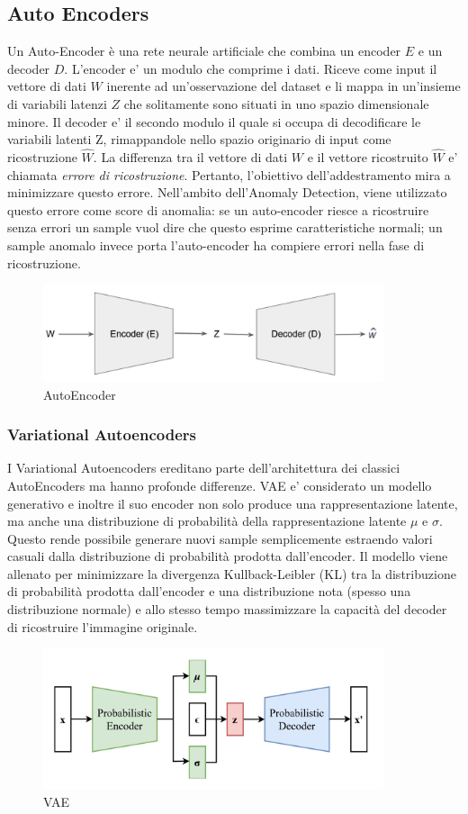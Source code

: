 \subsection{Auto Encoders}
Un Auto-Encoder è una rete neurale artificiale che combina un encoder $E$ e un decoder $D$. L'encoder e' un modulo che comprime i dati. Riceve come input il vettore di dati $W$ inerente ad un'osservazione del dataset e li mappa in un'insieme di variabili latenzi $Z$ che solitamente sono situati in uno spazio dimensionale minore. Il decoder e' il secondo modulo il quale si occupa di decodificare le variabili latenti Z, rimappandole nello spazio originario di input come ricostruzione $\widehat{W}$. La differenza tra il vettore di dati $W$ e il vettore ricostruito $\widehat{W}$ e' chiamata \textit{errore di ricostruzione}. Pertanto, l'obiettivo dell'addestramento mira a minimizzare questo errore. Nell'ambito dell'Anomaly Detection, viene utilizzato questo errore come score di anomalia: se un auto-encoder riesce a ricostruire senza errori un sample vuol dire che questo esprime caratteristiche normali; un sample anomalo invece porta l'auto-encoder ha compiere errori nella fase di ricostruzione.
\begin{figure}[t]
	\centering
	\includegraphics[width=10cm, scale=1]{images/ae}
	\caption{AutoEncoder}
	\label{ae}
\end{figure}
\subsubsection{Variational Autoencoders}
I Variational Autoencoders ereditano parte dell'architettura dei classici AutoEncoders ma hanno profonde differenze. VAE e' considerato un modello generativo e inoltre il suo encoder non solo produce una rappresentazione latente, ma anche una distribuzione di probabilità della rappresentazione latente $\mu$ e $\sigma$. Questo rende possibile generare nuovi sample semplicemente estraendo valori casuali dalla distribuzione di probabilità prodotta dall'encoder.
Il modello viene allenato per minimizzare la divergenza Kullback-Leibler (KL) tra la distribuzione di probabilità prodotta dall'encoder e una distribuzione nota (spesso una distribuzione normale) e allo stesso tempo massimizzare la capacità del decoder di ricostruire l'immagine originale.
\begin{figure}[t]
	\centering
	\includegraphics[width=10cm, scale=1]{images/vae}
	\caption{VAE}
	\label{vae}
\end{figure}

